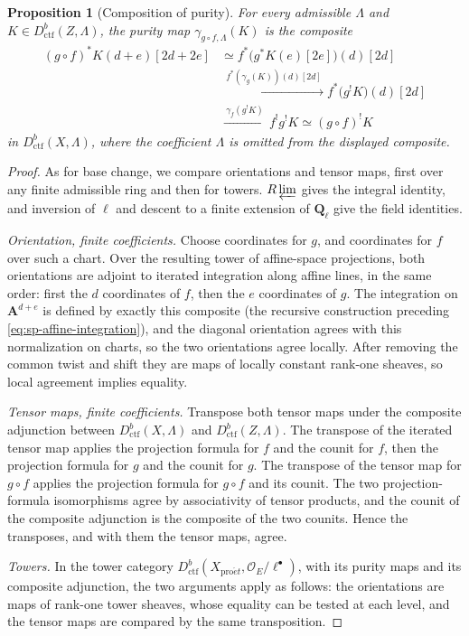 \documentclass[11pt,a4paper]{article}
\numberwithin{equation}{section}
\newtheorem{proposition}[theorem]{Proposition}
\theoremstyle{definition}
\theoremstyle{remark}
\newcommand{\Ql}{\mathbf Q_\ell}
\newcommand{\proet}{\mathrm{pro}\acute{e}t}
\newcommand{\Dctf}{D^b_{\mathrm{ctf}}}
\begin{document}
\begin{proposition}[Composition of purity]\label{prop:sp-composition}
For every admissible $\Lambda$ and $K\in\Dctf(Z,\Lambda)$,
the purity map $\gamma_{g\circ f,\Lambda}(K)$ is the composite
\begin{align*}
 (g\circ f)^{*}K(d+e)[2d+2e]
   &\simeq f^{*}\bigl(g^{*}K(e)[2e]\bigr)(d)[2d]\\
   &\xrightarrow{\ f^{*}(\gamma_g(K))(d)[2d]\ }
       f^{*}\bigl(g^!K\bigr)(d)[2d]\\
   &\xrightarrow{\ \gamma_f(g^!K)\ }
       f^!g^!K
   \simeq(g\circ f)^!K
\end{align*}
in $\Dctf(X,\Lambda)$, where the coefficient $\Lambda$ is omitted
from the displayed composite.
\end{proposition}
\begin{proof}
As for base change, we compare orientations and tensor maps, first
over any finite admissible ring and then for towers.
$R\varprojlim$ gives the integral identity, and inversion of $\ell$
and descent to a finite extension of $\Ql$ give the field identities.

\emph{Orientation, finite coefficients.} Choose coordinates for $g$, and
coordinates for $f$ over such a chart. Over the resulting tower of
affine-space projections, both orientations are adjoint to iterated
integration along affine lines, in the same order: first the $d$
coordinates of $f$, then the $e$ coordinates of $g$. The integration on
$\mathbf A^{d+e}$ is defined by exactly this composite (the recursive
construction preceding \eqref{eq:sp-affine-integration}), and the
diagonal orientation agrees with this normalization on charts, so the
two orientations agree locally. After removing the common twist and
shift they are maps of locally constant rank-one sheaves, so local
agreement implies equality.

\emph{Tensor maps, finite coefficients.} Transpose both tensor maps
under the composite adjunction between $\Dctf(X,\Lambda)$ and
$\Dctf(Z,\Lambda)$. The transpose of the iterated tensor map
applies the projection formula for $f$ and the counit for $f$, then the
projection formula for $g$ and the counit for $g$. The transpose of the
tensor map for $g\circ f$ applies the projection formula for $g\circ f$
and its counit. The two projection-formula isomorphisms agree by
associativity of tensor products, and the counit of the composite
adjunction is the composite of the two counits. Hence the transposes,
and with them the tensor maps, agree.

\emph{Towers.} In the tower category
$\Dctf(X_{\proet},\mathcal O_E/\ell^\bullet)$, with its purity maps and
its composite adjunction, the two arguments apply as follows: the
orientations are maps of rank-one tower sheaves, whose equality can be
tested at each level, and the tensor maps are compared by the same
transposition.
\end{proof}
\end{document}
